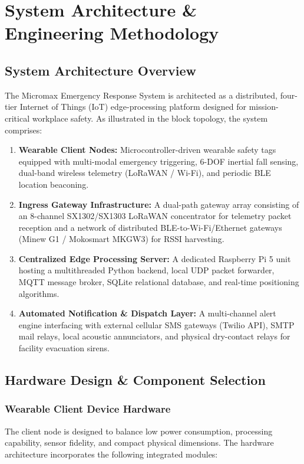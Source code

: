 \chapter{System Architecture \& Engineering Methodology}
\label{chap:methodology}

\section{System Architecture Overview}
The Micromax Emergency Response System is architected as a distributed, four-tier Internet of Things (IoT) edge-processing platform designed for mission-critical workplace safety. As illustrated in the block topology, the system comprises:
\begin{enumerate}
    \item \textbf{Wearable Client Nodes:} Microcontroller-driven wearable safety tags equipped with multi-modal emergency triggering, 6-DOF inertial fall sensing, dual-band wireless telemetry (LoRaWAN / Wi-Fi), and periodic BLE location beaconing.
    \item \textbf{Ingress Gateway Infrastructure:} A dual-path gateway array consisting of an 8-channel SX1302/SX1303 LoRaWAN concentrator for telemetry packet reception and a network of distributed BLE-to-Wi-Fi/Ethernet gateways (Minew G1 / Mokosmart MKGW3) for RSSI harvesting.
    \item \textbf{Centralized Edge Processing Server:} A dedicated Raspberry Pi 5 unit hosting a multithreaded Python backend, local UDP packet forwarder, MQTT message broker, SQLite relational database, and real-time positioning algorithms.
    \item \textbf{Automated Notification \& Dispatch Layer:} A multi-channel alert engine interfacing with external cellular SMS gateways (Twilio API), SMTP mail relays, local acoustic annunciators, and physical dry-contact relays for facility evacuation sirens.
\end{enumerate}

\section{Hardware Design \& Component Selection}

\subsection{Wearable Client Device Hardware}
The client node is designed to balance low power consumption, processing capability, sensor fidelity, and compact physical dimensions. The hardware architecture incorporates the following integrated modules:

